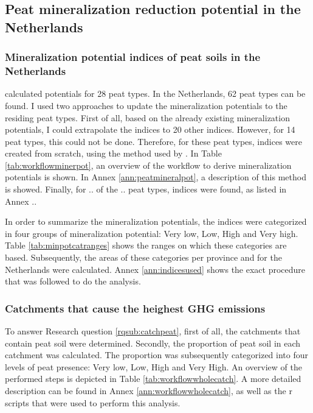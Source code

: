 {\subsection{Peat mineralization reduction potential in the Netherlands}

\subsubsection{Mineralization potential indices of peat soils in the Netherlands} \label{sec:mineralpotmet}

\citet{stouthamer2008toelichting} calculated potentials for 28 peat types. In the Netherlands, 62 peat types can be found. I used two approaches to update the mineralization potentials to the residing peat types. First of all, based on the already existing mineralization potentials, I could extrapolate the indices to 20 other indices. However, for 14 peat types, this could not be done. Therefore, for these peat types, indices were created from scratch, using the method used by \citet{stouthamer2008toelichting}. In Table \ref{tab:workflowminerpot}, an overview of the workflow to derive mineralization potentials is shown. In Annex \ref{ann:peatmineralpot}, a description of this method is showed. Finally, for .. of the .. peat types, indices were found, as listed in Annex .. 

In order to summarize the mineralization potentials, the indices were categorized in four groups of mineralization potential: Very low, Low, High and Very high. Table \ref{tab:minpotcatranges} shows the ranges on which these categories are based. Subsequently, the areas of these categories per province and for the Netherlands were calculated. Annex \ref{ann:indicesused} shows the exact procedure that was followed to do the analysis.
\subsubsection{Catchments that cause the heighest GHG emissions}

To answer Research question \ref{rqsub:catchpeat}, first of all, the catchments that contain peat soil were determined. Secondly, the proportion of peat soil in each catchment was calculated. The proportion was subsequently categorized into four levels of peat presence: Very low, Low, High and Very High. An overview of the performed steps is depicted in Table \ref{tab:workflowwholecatch}. A more detailed description can be found in Annex \ref{ann:workflowwholecatch}, as well as the r scripts that were used to perform this analysis.

}
